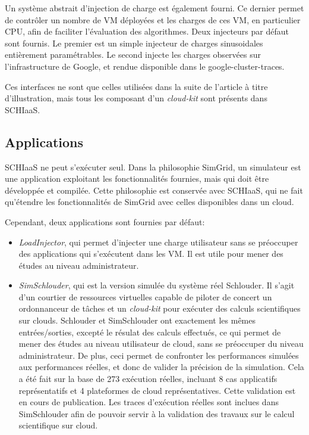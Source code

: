 \documentclass[parallelisme]{compas2017}
\begin{document}
Un  système abstrait  d'injection de  charge  est également  fourni. Ce  dernier
permet de  contrôler un  nombre de  VM déployées et  les charges  de ces  VM, en
particulier  CPU,   afin  de  faciliter  l'évaluation   des  algorithmes.   Deux
injecteurs  par défaut  sont  fournis. Le  premier est  un  simple injecteur  de
charges sinusoidales  entièrement paramétrables.  Le second injecte  les charges
observées  sur  l'infrastructure  de  Google,   et  rendue  disponible  dans  le
google-cluster-traces.

Ces interfaces ne sont  que celles utilisées dans la suite  de l'article à titre
d'illustration, mais tous les composant d'un \textit{cloud-kit} sont présents
dans SCHIaaS.  

\subsection{Applications}

SCHIaaS ne peut s'exécuter seul. Dans  la philosophie SimGrid, un simulateur est
une  application exploitant  les fonctionnalités  fournies, mais  qui doit  être
développée et  compilée.  Cette philosophie  est conservée avec SCHIaaS,  qui ne
fait qu'étendre les  fonctionnalités de SimGrid avec celles  disponibles dans un
cloud.

Cependant, deux applications sont fournies par défaut: 
\begin{itemize}
\item \emph{LoadInjector}, qui permet d'injecter  une charge utilisateur sans se
  préoccuper des  applications qui s'exécutent  dans les  VM. Il est  utile pour
  mener des études au niveau administrateur.
\item  \emph{SimSchlouder},  qui   est  la  version  simulée   du  système  réel
  Schlouder\cite{Michon2017}.  Il s'agit d'un  courtier de ressources virtuelles
  capable   de  piloter   de   concert   un  ordonnanceur   de   tâches  et   un
  \textit{cloud-kit}  pour  exécuter  des   calculs  scientifiques  sur  clouds.
  Schlouder et SimSchlouder ont exactement les mêmes entrées/sorties, excepté le
  résulat des  calculs effectués, ce  qui permet de  mener des études  au niveau
  utilisateur de  cloud, sans se  préoccuper du niveau administrateur.  De plus,
  ceci permet de confronter les  performances simulées aux performances réelles,
  et donc de valider la précision de la  simulation. Cela a été fait sur la base
  de  273 exécution  réelles, incluant  8  cas applicatifs  représentatifs et  4
  plateformes  de  cloud  représentatives.  Cette validation  est  en  cours  de
  publication.  Les traces  d'exécution réelles  sont inclues  dans SimSchlouder
  afin de pouvoir servir à la  validation des travaux sur le calcul scientifique
  sur cloud.
\end{itemize}
\end{document}
